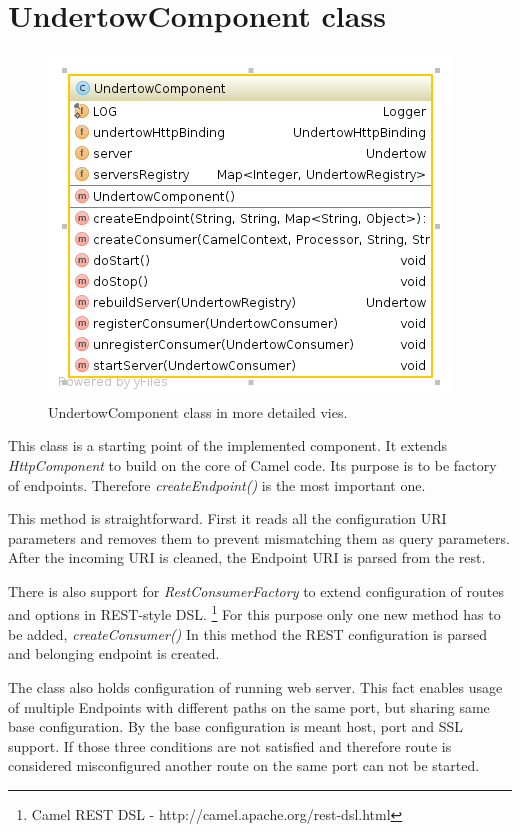 \documentclass[12pt,final,oneside]{fithesis2}
\begin{document}
\section{UndertowComponent class}
\begin{figure}[ht!]
\centering
\includegraphics[width=0.6\linewidth]{images/undertowComponent.png}
\caption{UndertowComponent class in more detailed vies.}
\end{figure}

This class is a starting point of the implemented component. It extends \textit{HttpComponent} to build on the core of Camel code. Its purpose is to be factory of endpoints. Therefore \textit{createEndpoint()} is the most important one.

This method is straightforward. First it reads all the configuration URI parameters and removes them to prevent mismatching them as query parameters. After the incoming URI is cleaned, the Endpoint URI is parsed from the rest.

There is also support for \textit{RestConsumerFactory} to extend configuration of routes and options in REST-style DSL. \footnote{Camel REST DSL - http://camel.apache.org/rest-dsl.html} For this purpose only one new method has to be added, \textit{createConsumer()} In this method the REST configuration is parsed and belonging endpoint is created.

The class also holds configuration of running web server. This fact enables usage of multiple Endpoints with different paths on the same port, but sharing same base configuration. By the base configuration is meant host, port and SSL support. If those three conditions are not satisfied and therefore route is considered misconfigured another route on the same port can not be started.
\end{document}
